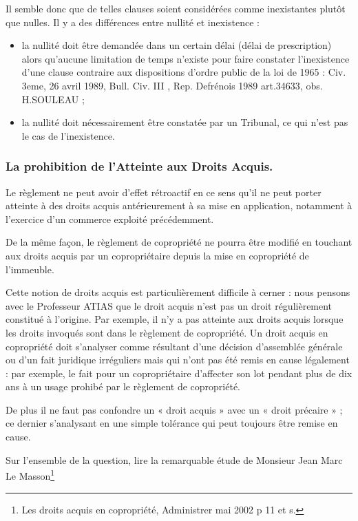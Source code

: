 			Il semble donc que de telles clauses soient considérées comme inexistantes plutôt que nulles. Il y a des différences entre nullité et inexistence :
			\begin{itemize}
				\item la nullité doit être demandée dans un certain délai (délai de prescription) alors qu'aucune limitation de temps n'existe pour faire constater l'inexistence d'une clause contraire aux dispositions d'ordre public de la loi de 1965 : Civ. 3eme, 26 avril 1989, Bull. Civ. III , Rep. Defrénois 1989 art.34633, obs. H.SOULEAU ;
				
				\item la nullité doit nécessairement être constatée par un Tribunal, ce qui n'est pas le cas de l'inexistence.
			\end{itemize}
		
		\subsubsection{La prohibition de l'Atteinte aux Droits Acquis.}
		
			Le règlement ne peut avoir d'effet rétroactif en ce sens qu'il ne peut porter atteinte à des droits acquis antérieurement à sa mise en application, notamment à l'exercice d'un commerce exploité précédemment.
			
			De la même façon, le règlement de copropriété ne pourra être modifié en touchant aux droits acquis par un copropriétaire depuis la mise en copropriété de l’immeuble.
			
			Cette notion de droits acquis est particulièrement difficile à cerner : nous pensons avec le Professeur ATIAS que le droit acquis n’est pas un droit régulièrement constitué à l’origine. Par exemple, il n’y a pas atteinte aux droits acquis lorsque les droits invoqués sont dans le règlement de copropriété. Un droit acquis en copropriété doit s’analyser comme résultant d’une décision d’assemblée générale ou d’un fait juridique irréguliers mais qui n’ont pas été remis en cause légalement : par exemple, le fait pour un copropriétaire d’affecter son lot pendant plus de dix ans à un usage prohibé par le règlement de copropriété.
			
			De plus il ne faut pas confondre un « droit acquis » avec un « droit précaire » ; ce dernier s’analysant en une simple tolérance qui peut toujours être remise en cause.
			
			Sur l’ensemble de la question, lire la remarquable étude de Monsieur Jean Marc Le Masson\footnote{Les droits acquis en copropriété, Administrer mai 2002 p 11 et s.}
	
